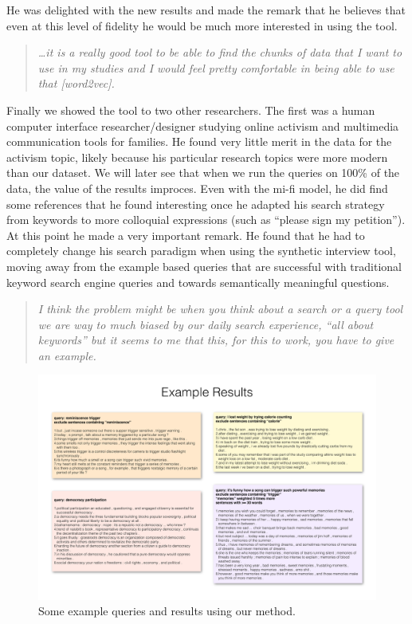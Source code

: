 \documentclass{sigchi}
\begin{document}
He was delighted with the new results and made the remark that he believes that even at this level of fidelity he would be much more interested in using the tool.
\begin{quote}
{\em
\dots it is a really good tool to be able to find the chunks of data that I want to use in my studies and I would feel pretty comfortable in being able to use that [word2vec].}
\end{quote}

Finally we showed the tool to two other researchers. The first was a human computer interface researcher/designer studying online activism and multimedia communication tools for families. He found very little merit in the data for the activism topic, likely because his particular research topics were more modern than our dataset. We will later see that when we run the queries on 100\% of the data, the value of the results improces. Even with the mi-fi model, he did find some references that he found interesting once he adapted his search strategy from keywords to more colloquial expressions (such as ``please sign my petition''). At this point he made a very important remark. He found that he had to completely change his search paradigm when using the synthetic interview tool, moving away from the example based queries that are successful with traditional keyword search engine queries and towards semantically meaningful questions. 

\begin{quote}
{\em
I think the problem might be when you think about a search or a query tool we are way to much biased by our daily search experience, ``all about keywords'' but it seems to me that this, for this to work, you have to give an example.
}\end{quote}

\begin{figure}[ht!]
\centering \includegraphics[width=\textwidth]{figures/results_2} 
\caption{Some example queries and results using our method.  \label{fig:reminiscenceTriggers}}
\end{figure}
\end{document}
